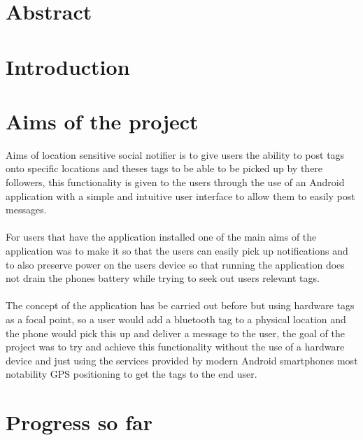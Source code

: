 \documentclass[a0,landscape]{a0poster}
\begin{document}
\begin{multicols}{4} %

\color{Navy}
\section{Abstract}

\color{Olive}
\section{Introduction}

\color{Black}
\section{Aims of the project}

Aims of location sensitive social notifier is to give users the ability to post tags onto specific locations and theses tags to be able to be picked up by there followers, this functionality is given to the users through the use of an Android application with a simple and intuitive user interface to allow them to easily post messages.\\
\\
For users that have the application installed one of the main aims of the application was to make it so that the users can easily pick up notifications and to also preserve power on the users device so that running the application does not drain the phones battery while trying to seek out users relevant tags.\\
\\
The concept of the application has be carried out before but using hardware tags as a focal point, so a user would add a bluetooth tag to a physical location and the phone would pick this up and deliver a message to the user, the goal of the project was to try and achieve this functionality without the use of a hardware device and just using the services provided by modern Android smartphones most notability GPS positioning to get the tags to the end user.

\section{Progress so far}


\end{multicols}
\end{document}

